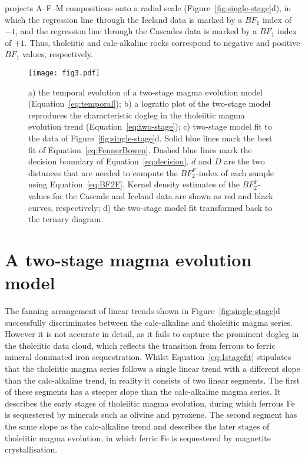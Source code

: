 \documentclass{article}
\begin{document}
\noindent projects A--F--M compositions onto a radial scale
(Figure~\ref{fig:single-stage}d), in which the regression line through
the Iceland data is marked by a $BF_1$ index of $-1$, and the
regression line through the Cascades data is marked by a $BF_1$ index
of $+1$. Thus, tholeiitic and calc-alkaline rocks correspond to
negative and positive $BF_1$ values, respectively.\medskip

\begin{figure}[!ht]
  \centering
  \texttt{[image: fig3.pdf]}
  \caption{ a) the temporal evolution of a two-stage magma evolution
    model (Equation~\ref{eq:temporal}); b) a logratio plot of the
    two-stage model reproduces the characteristic dogleg in the
    tholeiitic magma evolution trend (Equation~\ref{eq:two-stage}); c)
    two-stage model fit to the data of
    Figure~\ref{fig:single-stage}d. Solid blue lines mark the best fit
    of Equation~\ref{eq:FennerBowen}. Dashed blue lines mark the
    decision boundary of Equation~\ref{eq:decision}. $d$ and $D$ are
    the two distances that are needed to compute the $BF_2^F$-index of
    each sample using Equation~\ref{eq:BF2F}. Kernel density estimates
    of the $BF_2^F$-values for the Cascade and Iceland data are shown
    as red and black curves, respectively; d) the two-stage model fit
    transformed back to the ternary diagram.}
  \label{fig:two-stage}
\end{figure}

\section{A two-stage magma evolution model}\label{sec:two-stage}

The fanning arrangement of linear trends shown in
Figure~\ref{fig:single-stage}d successfully discriminates between the
calc-alkaline and tholeiitic magma series. However it is not accurate
in detail, as it fails to capture the prominent dogleg in the
tholeiitic data cloud, which reflects the transition from ferrous to
ferric mineral dominated iron sequestration. Whilst
Equation~\ref{eq:1stagefit} stipulates that the tholeiitic magma
series follows a single linear trend with a different slope than the
calc-alkaline trend, in reality it consists of two linear segments.
The first of these segments has a steeper slope than the calc-alkaline
magma series. It describes the early stages of tholeiitic magma
evolution, during which ferrous Fe is sequestered by minerals such as
olivine and pyroxene. The second segment has the same slope as the
calc-alkaline trend and describes the later stages of tholeiitic magma
evolution, in which ferric Fe is sequestered by magnetite
crystallisation.\medskip
\end{document}
